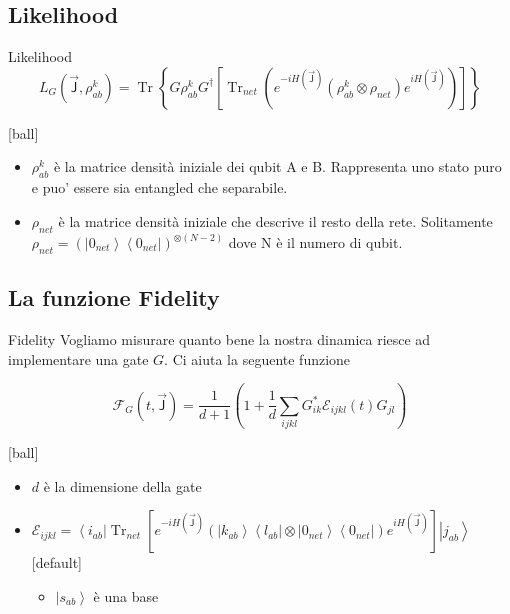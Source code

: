 \documentclass[xcolor=x11names,compress]{beamer}
\DeclareMathOperator{\Tr}{Tr}
\renewcommand{\(}{\begin{columns}}
\renewcommand{\)}{\end{columns}}
\newcommand{\<}[1]{\begin{column}{#1}}
\renewcommand{\>}{\end{column}}
\begin{document}
\subsection{Likelihood}
\begin{frame}{Likelihood}
\small{$$L_G \left( \vec{\textsf{J}}, \rho_{ab}^k \right) =  \Tr \left\{ G \rho_{ab}^k G^{\dag} \left[  \Tr_{net} \left( e^{-iH(\vec{\textsf{J}})} ( \rho_{ab}^k \otimes \rho_{net} ) e^{iH(\vec{\textsf{J}})} \right) \right]  \right\}$$}


[ball]
\begin{itemize}
  \item $\rho_{ab}^k$ è la matrice densità iniziale dei qubit A e B. Rappresenta uno stato puro e puo' essere sia entangled che separabile.
  \item $\rho_{net}$ è la matrice densità iniziale che descrive il resto della rete. Solitamente $\rho_{net} = \left( \left| 0_{net} \right\rangle \left\langle 0_{net} \right| \right) ^{\otimes (N-2)}$ dove N è il numero di qubit.
\end{itemize}

\end{frame}


\subsection{La funzione Fidelity}
\begin{frame}{Fidelity}
Vogliamo misurare quanto bene la nostra dinamica riesce ad implementare una gate $G$. Ci aiuta la seguente funzione

\begin{equation}
\mathcal{F}_G \left( t, \vec{\textsf{J}} \right) = \dfrac{1}{d+1} \left( 1 + \dfrac{1}{d} \sum _{ijkl} G^*_{ik} \mathcal{E}_{ijkl} \left( t \right)  G_{jl} \right)
\end{equation} 

[ball]
\begin{itemize}
  \item $d$ è la dimensione della gate
  \item $\mathcal{E}_{ijkl} = \left\langle i_{ab} \right| \Tr_{net} \left[ e^{-iH(\vec{\textsf{J}})} \left( \left| k_{ab} \right\rangle \left\langle l_{ab} \right| \otimes \left| 0_{net} \right\rangle \left\langle 0_{net} \right| \right) e^{iH(\vec{\textsf{J}})} \right] \left| j_{ab} \right\rangle$
  [default]  
  \begin{itemize}
  	\item $\left| s_{ab} \right\rangle$ è una base
  \end{itemize}
  	
\end{itemize}

\end{frame}
\end{document}
